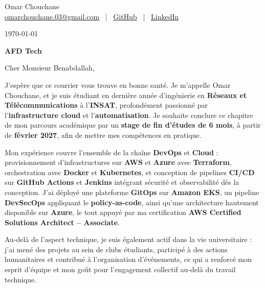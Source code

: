 \documentclass[12pt]{article}
\begin{document}

\begin{center}

{\Huge Omar Chouchane}\\[4pt]

\href{mailto:omarchouchane.03@gmail.com}{omarchouchane.03@gmail.com}
\ | \
\href{https://github.com/OmarChouchane}{GitHub}
\ | \
\href{https://linkedin.com/in/omar-chouchane-87215a201}{LinkedIn}

\end{center}

\vspace{10pt}

\today

\vspace{4pt}

\textbf{AFD Tech}

\vspace{10pt}

Cher Monsieur Benabdallah,

\vspace{5pt}

J'espère que ce courrier vous trouve en bonne santé. Je m'appelle Omar Chouchane, et je suis étudiant en dernière année d'ingénierie en \textbf{Réseaux et Télécommunications} à l'\textbf{INSAT}, profondément passionné par l'\textbf{infrastructure cloud} et l'\textbf{automatisation}. Je souhaite conclure ce chapitre de mon parcours académique par un \textbf{stage de fin d'études de 6 mois}, à partir de \textbf{février 2027}, afin de mettre mes compétences en pratique.

\vspace{5pt}

Mon expérience couvre l'ensemble de la chaîne \textbf{DevOps} et \textbf{Cloud} : provisionnement d'infrastructures sur \textbf{AWS} et \textbf{Azure} avec \textbf{Terraform}, orchestration avec \textbf{Docker} et \textbf{Kubernetes}, et conception de pipelines \textbf{CI/CD} sur \textbf{GitHub Actions} et \textbf{Jenkins} intégrant sécurité et observabilité dès la conception. J'ai déployé une plateforme \textbf{GitOps} sur \textbf{Amazon EKS}, un pipeline \textbf{DevSecOps} appliquant le \textbf{policy-as-code}, ainsi qu'une architecture hautement disponible sur \textbf{Azure}, le tout appuyé par ma certification \textbf{AWS Certified Solutions Architect -- Associate}.

\vspace{5pt}

Au-delà de l'aspect technique, je suis également actif dans la vie universitaire : j'ai mené des projets au sein de clubs étudiants, participé à des actions humanitaires et contribué à l'organisation d'événements, ce qui a renforcé mon esprit d'équipe et mon goût pour l'engagement collectif au-delà du travail technique.
\end{document}
